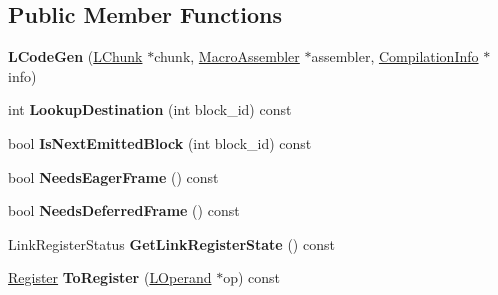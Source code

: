 \subsection*{Public Member Functions}
\begin{DoxyCompactItemize}
\item 
{\bfseries L\+Code\+Gen} (\hyperlink{classv8_1_1internal_1_1_l_chunk}{L\+Chunk} $\ast$chunk, \hyperlink{classv8_1_1internal_1_1_macro_assembler}{Macro\+Assembler} $\ast$assembler, \hyperlink{classv8_1_1internal_1_1_compilation_info}{Compilation\+Info} $\ast$info)\hypertarget{classv8_1_1internal_1_1_l_code_gen_aed907f71b0a7b9401ce1c0c883ed449b}{}\label{classv8_1_1internal_1_1_l_code_gen_aed907f71b0a7b9401ce1c0c883ed449b}

\item 
int {\bfseries Lookup\+Destination} (int block\+\_\+id) const \hypertarget{classv8_1_1internal_1_1_l_code_gen_aed7b32e45855e787600f16ad151865c4}{}\label{classv8_1_1internal_1_1_l_code_gen_aed7b32e45855e787600f16ad151865c4}

\item 
bool {\bfseries Is\+Next\+Emitted\+Block} (int block\+\_\+id) const \hypertarget{classv8_1_1internal_1_1_l_code_gen_a679c74faee0e58ff843fdfa52dc927a9}{}\label{classv8_1_1internal_1_1_l_code_gen_a679c74faee0e58ff843fdfa52dc927a9}

\item 
bool {\bfseries Needs\+Eager\+Frame} () const \hypertarget{classv8_1_1internal_1_1_l_code_gen_a3487a9e332e1674eeac175bdd43851bd}{}\label{classv8_1_1internal_1_1_l_code_gen_a3487a9e332e1674eeac175bdd43851bd}

\item 
bool {\bfseries Needs\+Deferred\+Frame} () const \hypertarget{classv8_1_1internal_1_1_l_code_gen_aecf1941fcb8a169141d3e26237c64c67}{}\label{classv8_1_1internal_1_1_l_code_gen_aecf1941fcb8a169141d3e26237c64c67}

\item 
Link\+Register\+Status {\bfseries Get\+Link\+Register\+State} () const \hypertarget{classv8_1_1internal_1_1_l_code_gen_a4330f8a3b7244a39a610c44efa066045}{}\label{classv8_1_1internal_1_1_l_code_gen_a4330f8a3b7244a39a610c44efa066045}

\item 
\hyperlink{structv8_1_1internal_1_1_register}{Register} {\bfseries To\+Register} (\hyperlink{classv8_1_1internal_1_1_l_operand}{L\+Operand} $\ast$op) const \hypertarget{classv8_1_1internal_1_1_l_code_gen_ab3dda8b86a7b8303006365eb51069db1}{}\label{classv8_1_1internal_1_1_l_code_gen_ab3dda8b86a7b8303006365eb51069db1}


\end{DoxyCompactItemize}
